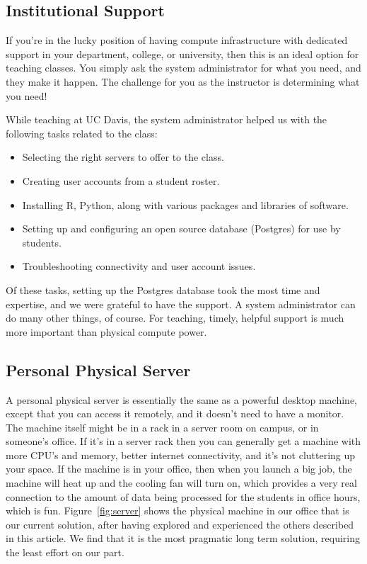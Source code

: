 \documentclass[12pt]{article}
\begin{document}
\subsection{Institutional Support}

If you're in the lucky position of having compute infrastructure with dedicated support in your department, college, or university, then this is an ideal option for teaching classes.
You simply ask the system administrator for what you need, and they make it happen.
The challenge for you as the instructor is determining what you need!

While teaching at UC Davis, the system administrator helped us with the following tasks related to the class:
\begin{itemize}
\item Selecting the right servers to offer to the class.
\item Creating user accounts from a student roster.
\item Installing R, Python, along with various packages and libraries of software.
\item Setting up and configuring an open source database (Postgres) for use by students.
\item Troubleshooting connectivity and user account issues.
\end{itemize}
Of these tasks, setting up the Postgres database took the most time and expertise, and we were grateful to have the support.
A system administrator can do many other things, of course.
For teaching, timely, helpful support is much more important than physical compute power.


\subsection{Personal Physical Server}

A personal physical server is essentially the same as a powerful desktop machine, except that you can access it remotely, and it doesn't need to have a monitor.
The machine itself might be in a rack in a server room on campus, or in someone's office.
If it's in a server rack then you can generally get a machine with more CPU's and memory, better internet connectivity, and it's not cluttering up your space.
If the machine is in your office, then when you launch a big job, the machine will heat up and the cooling fan will turn on, which provides a very real connection to the amount of data being processed for the students in office hours, which is fun.
Figure~\ref{fig:server} shows the physical machine in our office that is our current solution, after having explored and experienced the others described in this article.
We find that it is the most pragmatic long term solution, requiring the least effort on our part.
\end{document}
